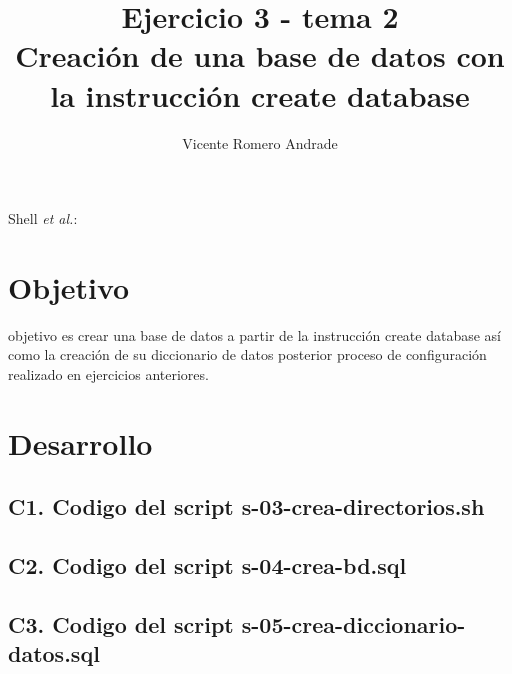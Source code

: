 \documentclass[journal]{IEEEtran}
\begin{document}
\title{Ejercicio 3 - tema 2 \\ Creación de una base de datos con la instrucción create database}
%
\author{Vicente Romero Andrade}

%
{Shell \MakeLowercase{\textit{et al.}}: }

\maketitle


\IEEEpeerreviewmaketitle

\section{Objetivo}

 objetivo es crear una base de datos a partir de la instrucción create database así como la creación de su diccionario de datos posterior proceso de
configuración realizado en ejercicios anteriores.


\section{Desarrollo}
\subsection{C1. Codigo del script s-03-crea-directorios.sh}

\subsection{C2. Codigo del script s-04-crea-bd.sql}

\subsection{C3. Codigo del script s-05-crea-diccionario-datos.sql}

\end{document}
